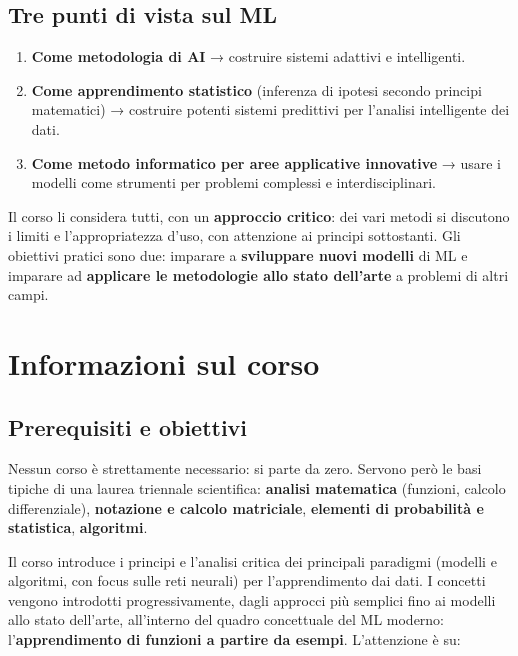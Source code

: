\subsection{Tre punti di vista sul ML}\label{tre-punti-di-vista-sul-ml}

\begin{enumerate}
\def\labelenumi{\arabic{enumi}.}
\tightlist
\item
  \textbf{Come metodologia di AI} → costruire sistemi adattivi e
  intelligenti.
\item
  \textbf{Come apprendimento statistico} (inferenza di ipotesi secondo
  principi matematici) → costruire potenti sistemi predittivi per
  l'analisi intelligente dei dati.
\item
  \textbf{Come metodo informatico per aree applicative innovative} →
  usare i modelli come strumenti per problemi complessi e
  interdisciplinari.
\end{enumerate}

Il corso li considera tutti, con un \textbf{approccio critico}: dei vari
metodi si discutono i limiti e l'appropriatezza d'uso, con attenzione ai
principi sottostanti. Gli obiettivi pratici sono due: imparare a
\textbf{sviluppare nuovi modelli} di ML e imparare ad \textbf{applicare
le metodologie allo stato dell'arte} a problemi di altri campi.

\section{Informazioni sul corso}\label{informazioni-sul-corso}

\subsection{Prerequisiti e obiettivi}\label{prerequisiti-e-obiettivi}

Nessun corso è strettamente necessario: si parte da zero. Servono però
le basi tipiche di una laurea triennale scientifica: \textbf{analisi
matematica} (funzioni, calcolo differenziale), \textbf{notazione e
calcolo matriciale}, \textbf{elementi di probabilità e statistica},
\textbf{algoritmi}.

Il corso introduce i principi e l'analisi critica dei principali
paradigmi (modelli e algoritmi, con focus sulle reti neurali) per
l'apprendimento dai dati. I concetti vengono introdotti
progressivamente, dagli approcci più semplici fino ai modelli allo stato
dell'arte, all'interno del quadro concettuale del ML moderno:
l'\textbf{apprendimento di funzioni a partire da esempi}. L'attenzione è
su:

